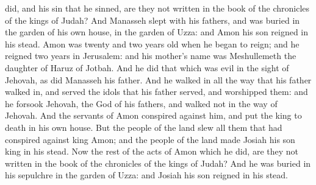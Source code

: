 did, and his sin that he sinned, are they not written in the book of the chronicles of the kings of Judah? And Manasseh slept with his fathers, and was buried in the garden of his own house, in the garden of Uzza: and Amon his son reigned in his stead.  Amon was twenty and two years old when he began to reign; and he reigned two years in Jerusalem: and his mother’s name was Meshullemeth the daughter of Haruz of Jotbah. And he did that which was evil in the sight of Jehovah, as did Manasseh his father. And he walked in all the way that his father walked in, and served the idols that his father served, and worshipped them: and he forsook Jehovah, the God of his fathers, and walked not in the way of Jehovah. And the servants of Amon conspired against him, and put the king to death in his own house. But the people of the land slew all them that had conspired against king Amon; and the people of the land made Josiah his son king in his stead. Now the rest of the acts of Amon which he did, are they not written in the book of the chronicles of the kings of Judah? And he was buried in his sepulchre in the garden of Uzza: and Josiah his son reigned in his stead. 


